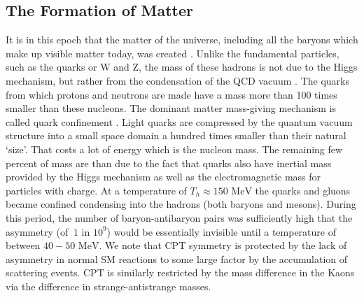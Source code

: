 \documentclass[universe,article,submit,moreauthors,pdftex,a4paper]{Definitions/mdpi}
\newcommand{\MeV}{\text{ MeV}}
\begin{document}
\subsection{The Formation of Matter}\label{sec:Creation}
\noindent It is in this epoch that the matter of the universe, including all the baryons which make up visible matter today, was created \cite{Rafelski:2019twp}. Unlike the fundamental particles, such as the quarks or W and Z, the mass of these hadrons is not due to the Higgs mechanism, but rather from the condensation of the QCD vacuum \cite{Rafelski:2015cxa,Roberts:2021xnz,Roberts:2022rxm}. The quarks from which protons and neutrons are made have a mass more than 100 times smaller than these nucleons. The dominant matter mass-giving mechanism is called quark confinement \cite{Hagedorn:1984hz}. Light quarks are compressed by the quantum vacuum structure into a small space domain a hundred times smaller than their natural `size'. That costs a lot of energy which is the nucleon mass. The remaining few percent of mass are than due to the fact that quarks also have inertial mass provided by the Higgs mechanism as well as the electromagnetic mass for particles with charge. At a temperature of $T_{h}\approx150\MeV$ the quarks and gluons became confined condensing into the hadrons (both baryons and mesons). During this period, the number of baryon-antibaryon pairs was sufficiently high that the asymmetry (of $~1$ in $10^{9}$) would be essentially invisible until a temperature of between $40-50\MeV$. We note that CPT symmetry is protected by the lack of asymmetry in normal SM reactions to some large factor by the accumulation of scattering events. CPT is similarly restricted by the mass difference in the Kaons via the difference in strange-antistrange masses.
\end{document}
